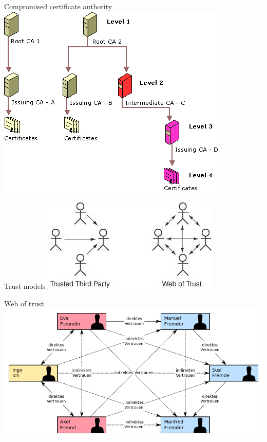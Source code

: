 \documentclass[11pt]{beamer}
\begin{document}
\begin{frame}{Compromised certificate authority}
\includegraphics[scale=0.5]{certificate_authority_compromised.png}
\end{frame}

\begin{frame}{Trust models}
\includegraphics[scale=1.0]{trust_models.jpeg}
\end{frame}

\begin{frame}{Web of trust}
\includegraphics[scale=0.44]{web_of_trust.png}
\end{frame}
\end{document}
